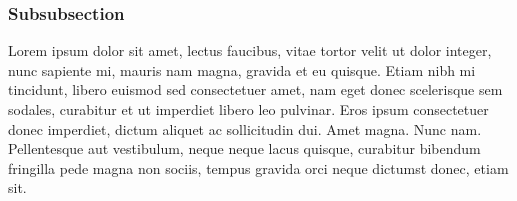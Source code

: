 \documentclass[letterpaper, 12pt, dvips]{mitwpl}
\begin{document}
\subsubsection{Subsubsection}

Lorem ipsum dolor sit amet, lectus faucibus, vitae tortor velit ut dolor integer, nunc sapiente mi, mauris nam magna, gravida et eu quisque. Etiam nibh mi tincidunt, libero euismod sed consectetuer amet, nam eget donec scelerisque sem sodales, curabitur et ut imperdiet libero leo pulvinar. Eros ipsum consectetuer donec imperdiet, dictum aliquet ac sollicitudin dui. Amet magna. Nunc nam. Pellentesque aut vestibulum, neque neque lacus quisque, curabitur bibendum fringilla pede magna non sociis, tempus gravida orci neque dictumst donec, etiam sit.

\custombib{}
\end{document}
